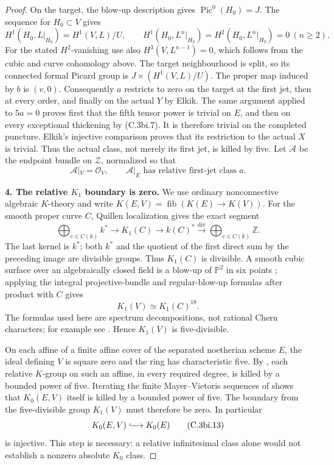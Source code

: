 \begin{proof}
On the target, the blow-up description gives
$\operatorname{Pic}^0(H_0)=J$. The sequence for $H_0\subset V$ gives
\[
 H^1(H_0,L|_{H_0})=H^1(V,L)/U,
 \qquad H^1(H_0,L^n|_{H_0})=H^2(H_0,L^n|_{H_0})=0\ (n\ge2).
\]
For the stated $H^2$-vanishing use also $H^3(V,L^{n-1})=0$, which
follows from the cubic and curve cohomology above. The target
neighbourhood is split, so its connected formal Picard group is
$J\times(H^1(V,L)/U)$. The proper map induced by $b$ is $(v,0)$.
Consequently $a$ restricts to zero on the target at the first jet, then
at every order, and finally on the actual $Y$ by Elkik. The same argument applied to $5a=0$ proves first that the fifth
tensor power is trivial on $E$, and then on every exceptional
thickening by (C.3bi.7). It is therefore trivial on the completed
puncture. Elkik's injective comparison proves that its restriction
to the actual $X$ is trivial. Thus the actual class, not merely its
first jet, is killed by five. Let $\mathcal A$ be the endpoint bundle on
$\mathcal Z$, normalized so that
\[
 \mathcal A|_V=\mathcal O_V,\qquad
 \mathcal A|_E\text{ has relative first-jet class }a.
 \tag{C.3bi.10}
\]

\textbf{4. The relative $K_1$ boundary is zero.}
We use ordinary nonconnective algebraic $K$-theory and write
$K(E,V)=\operatorname{fib}(K(E)\to K(V))$. For the smooth proper
curve $C$, Quillen localization \citep[Section 7, Proposition 3.2 and (3.3),
p.~127]{rootQuillen1973}
gives the exact segment
\[
 \bigoplus_{c\in C(k)}k^*\longrightarrow K_1(C)
 \longrightarrow k(C)^*\xrightarrow{\operatorname{div}}
 \bigoplus_{c\in C(k)}\mathbb Z.
 \tag{C.3bi.11}
\]
The last kernel is $k^*$; both $k^*$ and the quotient of the first
direct sum by the preceding image are divisible groups. Thus $K_1(C)$
is divisible. A smooth cubic surface over an algebraically closed field
is a blow-up of $\mathbb P^2$ in six points
\citep[Chapter 4, Proposition 2.4, author p.~178]{D_HuybrechtsCubics};
applying the integral
projective-bundle and regular-blow-up formulas after product with $C$
gives
\[
 K_1(V)\simeq K_1(C)^{18}.
 \tag{C.3bi.12}
\]
The formulas used here are spectrum decompositions, not rational Chern
characters; for example see \citet[Corollaries 3.6 and 4.4, author
pp.~12 and 16]{D_Khan2020Blowup}. Hence $K_1(V)$ is five-divisible.

On each affine of a finite affine cover of the separated noetherian
scheme $E$, the ideal defining $V$ is square zero and the ring has
characteristic five. By \citet[Theorem A, p.~29]{rootGeisserHesselholt2011},
each relative $K$-group on such an affine, in every required degree,
is killed by a bounded power of five. Iterating the finite
Mayer--Vietoris sequences of \citet[Theorem 8.1]{D_ThomasonTrobaugh1990}
shows that $K_0(E,V)$ itself is killed by a bounded power of five.
The boundary from the five-divisible group $K_1(V)$ must therefore
be zero. In particular
\[
 K_0(E,V)\lhook\joinrel\longrightarrow K_0(E)
 \tag{C.3bi.13}
\]
is injective. This step is necessary: a relative infinitesimal class
alone would not establish a nonzero absolute $K_0$ class.


\end{proof}
